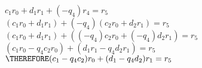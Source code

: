 
$c_1 r_0 + d_1 r_1 + (-q_4) r_4  = r_5$ \\
$(c_1 r_0 + d_1 r_1) + (-q_4) (c_2 r_0 + d_2 r_1)  = r_5$ \\
$(c_1 r_0 + d_1 r_1) + ((-q_4)c_2 r_0 + (-q_4)d_2 r_1)  = r_5$ \\
$(c_1 r_0 - q_4c_2 r_0) + (d_1 r_1 - q_4 d_2 r_1) = r_5$ \\
$\THEREFORE (c_1 - q_4c_2)r_0 + (d_1 - q_4 d_2)r_1 = r_5$


